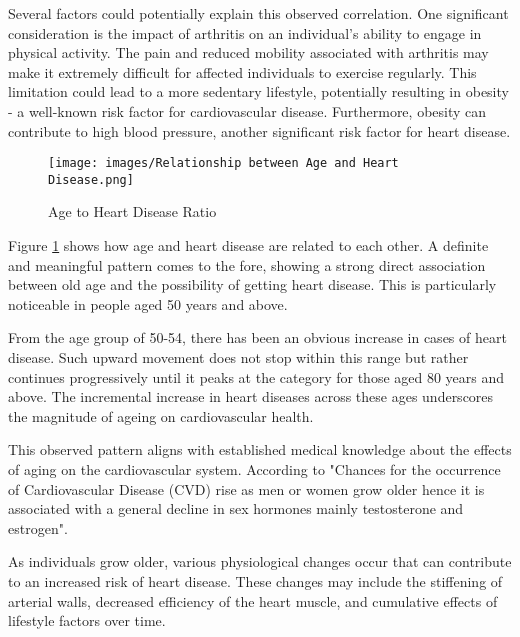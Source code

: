 \documentclass[12pt, a4paper,twoside]{report}
\numberwithin{equation}{chapter}
\begin{document}
Several factors could potentially explain this observed correlation. One significant consideration is the impact of arthritis on an individual's ability to engage in physical activity. The pain and reduced mobility associated with arthritis may make it extremely difficult for affected individuals to exercise regularly. This limitation could lead to a more sedentary lifestyle, potentially resulting in obesity - a well-known risk factor for cardiovascular disease. Furthermore, obesity can contribute to high blood pressure, another significant risk factor for heart disease.


 \begin{figure}[h]
     \centering
    \texttt{[image: images/Relationship between Age and Heart Disease.png]}
     \caption{Age to Heart Disease Ratio}
    \label{fig:age-heart}
 \end{figure}

Figure \ref{fig:age-heart} shows how age and heart disease are related to each other. A definite and meaningful pattern comes to the fore, showing a strong direct association between old age and the possibility of getting heart disease. This is particularly noticeable in people aged 50 years and above.

From the age group of 50-54, there has been an obvious increase in cases of heart disease. Such upward movement does not stop within this range but rather continues progressively until it peaks at the category for those aged 80 years and above. The incremental increase in heart diseases across these ages underscores the magnitude of ageing on cardiovascular health.

This observed pattern aligns with established medical knowledge about the effects of aging on the cardiovascular system. According to \parencite{rodgers} "Chances for the occurrence of Cardiovascular Disease (CVD) rise as men or women grow older hence it is associated with a general decline in sex hormones mainly testosterone and estrogen".

As individuals grow older, various physiological changes occur that can contribute to an increased risk of heart disease. These changes may include the stiffening of arterial walls, decreased efficiency of the heart muscle, and cumulative effects of lifestyle factors over time. 


\end{document}
